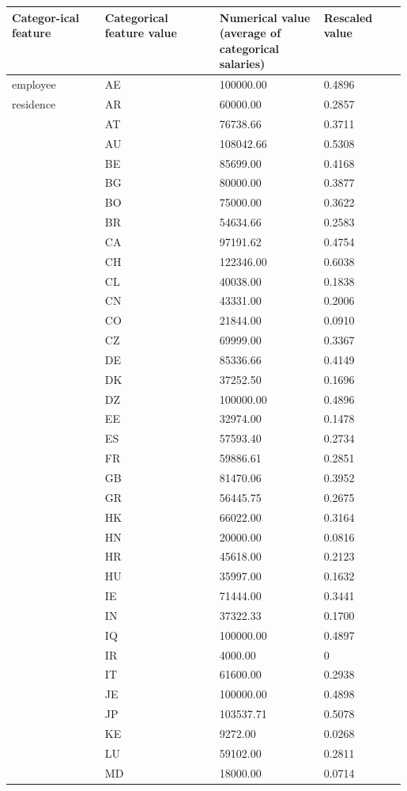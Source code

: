 \documentclass[11pt,a4paper]{article}
\begin{document}
\begin{table}
\centering
\begin{tabular}{p{0.15\linewidth}|p{0.18\linewidth}|p{0.15\linewidth}|p{0.10\linewidth}} \hline
\textbf{Categor-ical feature}&\textbf{Categorical feature value}&\textbf{Numerical value} (average of categorical salaries)&\textbf{Rescaled value}\\ \hline
employee&AE&100000.00&0.4896\\
residence&AR&60000.00&0.2857\\
&AT&76738.66&0.3711\\
&AU&108042.66&0.5308\\
&BE&85699.00&0.4168\\
&BG&80000.00&0.3877\\
&BO&75000.00&0.3622\\
&BR&54634.66&0.2583\\
&CA&97191.62&0.4754\\
&CH&122346.00&0.6038\\
&CL&40038.00&0.1838\\
&CN&43331.00&0.2006\\
&CO&21844.00&0.0910\\
&CZ&69999.00&0.3367\\
&DE&85336.66&0.4149\\
&DK&37252.50&0.1696\\
&DZ&100000.00&0.4896\\
&EE&32974.00&0.1478\\
&ES&57593.40&0.2734\\
&FR&59886.61&0.2851\\
&GB&81470.06&0.3952\\
&GR&56445.75&0.2675\\
&HK&66022.00&0.3164\\
&HN&20000.00&0.0816\\
&HR&45618.00&0.2123\\
&HU&35997.00&0.1632\\
&IE&71444.00&0.3441\\
&IN&37322.33&0.1700\\
&IQ&100000.00&0.4897\\
&IR&4000.00&0\\
&IT&61600.00&0.2938\\
&JE&100000.00&0.4898\\
&JP&103537.71&0.5078\\
&KE&9272.00&0.0268\\
&LU&59102.00&0.2811\\
&MD&18000.00&0.0714\\

\end{tabular}
\end{table}
\end{document}
